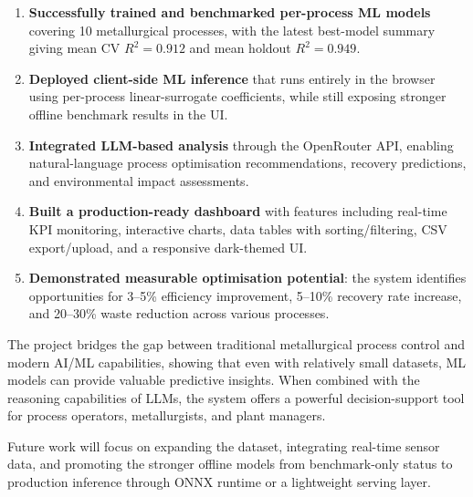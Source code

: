 \documentclass[12pt,a4paper]{report}
\begin{document}
\begin{enumerate}
  \item \textbf{Successfully trained and benchmarked per-process ML models} covering 10 metallurgical processes, with the latest best-model summary giving mean CV $R^2 = 0.912$ and mean holdout $R^2 = 0.949$.

  \item \textbf{Deployed client-side ML inference} that runs entirely in the browser using per-process linear-surrogate coefficients, while still exposing stronger offline benchmark results in the UI.

  \item \textbf{Integrated LLM-based analysis} through the OpenRouter API, enabling natural-language process optimisation recommendations, recovery predictions, and environmental impact assessments.

  \item \textbf{Built a production-ready dashboard} with features including real-time KPI monitoring, interactive charts, data tables with sorting/filtering, CSV export/upload, and a responsive dark-themed UI.

  \item \textbf{Demonstrated measurable optimisation potential}: the system identifies opportunities for 3–5\% efficiency improvement, 5–10\% recovery rate increase, and 20–30\% waste reduction across various processes.
\end{enumerate}

The project bridges the gap between traditional metallurgical process control and modern AI/ML capabilities, showing that even with relatively small datasets, ML models can provide valuable predictive insights. When combined with the reasoning capabilities of LLMs, the system offers a powerful decision-support tool for process operators, metallurgists, and plant managers.

Future work will focus on expanding the dataset, integrating real-time sensor data, and promoting the stronger offline models from benchmark-only status to production inference through ONNX runtime or a lightweight serving layer.
\end{document}
